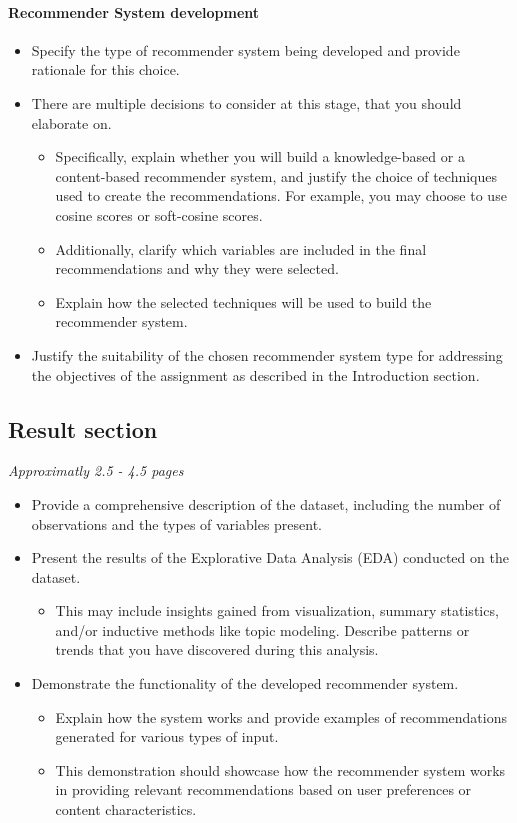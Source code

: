 \paragraph{Recommender System development}
\begin{itemize}
\item Specify the type of recommender system being developed and provide rationale for this choice. 
\item There are multiple decisions to consider at this stage, that you should elaborate on. 
\begin{itemize}
\item Specifically, explain whether you will build a knowledge-based or a content-based recommender system, and justify the choice of techniques used to create the recommendations. For example, you may choose to use cosine scores or soft-cosine scores.
\item Additionally, clarify which variables are included in the final recommendations and why they were selected.
\item Explain how the selected techniques will be used to build the recommender system.
\end{itemize}
\item Justify the suitability of the chosen recommender system type for addressing the objectives of the assignment as described in the Introduction section. 
\end{itemize}

\subsection{Result section}
\textit{Approximatly 2.5 - 4.5 pages}

\begin{itemize}
\item Provide a comprehensive description of the dataset, including the number of observations and the types of variables present.
\item Present the results of the Explorative Data Analysis (EDA) conducted on the dataset. 
\begin{itemize}
	\item This may include insights gained from visualization, summary statistics, and/or inductive methods like topic modeling. Describe patterns or trends that you have discovered during this analysis.
\end{itemize}
\item Demonstrate the functionality of the developed recommender system. 
\begin{itemize}
\item Explain how the system works and provide examples of recommendations generated for various types of input. 
\item This demonstration should showcase how the recommender system works in providing relevant recommendations based on user preferences or content characteristics.
\end{itemize}
\end{itemize}

